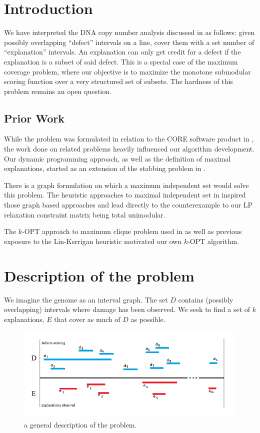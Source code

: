 \section{Introduction}

We have interpreted the DNA copy number analysis discussed in \cite{krasnitz2013target} as follows: given possibly overlapping ``defect'' intervals on a line, cover them with a set number of ``explanation'' intervals.  An explanation can only get credit for a defect if the explanation is a subset of said defect.  This is a special case of the maximum coverage problem, where our objective is to maximize the monotone submodular scoring function over a very structured set of subsets.  The hardness of this problem remains an open question.

\subsection{Prior Work} 

While the problem was formulated in relation to the CORE software product in \cite{krasnitz2013target}, the work done on related problems heavily influenced our algorithm development.  Our dynamic programming approach, as well as the definition of maximal explanations, started as an extension of the stabbing problem in \cite{katz2005orthogonal}. 

There is a graph formulation on which a maximum independent set would solve this problem. The heuristic approaches to maximal independent set in \cite{blelloch2012greedy} inspired those graph based approaches and lead directly to the counterexample to our LP relaxation constraint matrix being total unimodular. 

The $k$-OPT approach to maximum clique problem used in \cite{katayama2005effective} as well as previous exposure to the Lin-Kerrigan heuristic \cite{lin1973effective} motivated our own $k$-OPT algorithm.

\section{Description of the problem}

We imagine the genome as an interval graph. The set $D$ contains (possibly overlapping) intervals where damage has been observed.  We seek to find a set of $k$ explanations, $E$ that cover as much of $D$ as possible.

\begin{figure}[ht!]
    \centering
        \includegraphics[width=0.99\textwidth]{baseline.png}
    \caption{a general description of the problem.}
\label{fig:genDesc1}
\end{figure}

